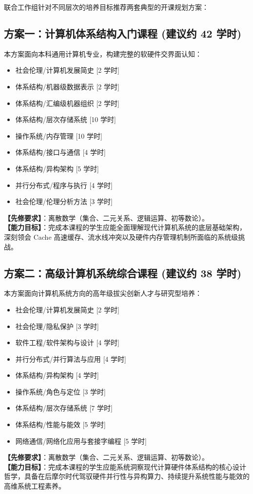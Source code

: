联合工作组针对不同层次的培养目标推荐两套典型的开课规划方案：

\subsection{方案一：计算机体系结构入门课程 (建议约 42 学时)}
本方案面向本科通用计算机专业，构建完整的软硬件交界面认知：
\begin{itemize}
    \item 社会伦理/计算机发展简史 [2 学时]
    \item 体系结构/机器级数据表示 [2 学时]
    \item 体系结构/汇编级机器组织 [2 学时]
    \item 体系结构/层次存储系统 [10 学时]
    \item 操作系统/内存管理 [10 学时]
    \item 体系结构/接口与通信 [4 学时]
    \item 体系结构/异构架构 [5 学时]
    \item 并行分布式/程序与执行 [4 学时]
    \item 社会伦理/伦理分析方法 [3 学时]
\end{itemize}
\textbf{【先修要求】}：离散数学（集合、二元关系、逻辑运算、初等数论）。\\
\textbf{【能力目标】}：完成本课程的学生应能全面理解现代计算机系统的底层基础架构，深刻领会 Cache 高速缓存、流水线冲突以及硬件内存管理机制所面临的系统级挑战。

\subsection{方案二：高级计算机系统综合课程 (建议约 38 学时)}
本方案面向计算机系统方向的高年级拔尖创新人才与研究型培养：
\begin{itemize}
    \item 社会伦理/计算机发展简史 [2 学时]
    \item 社会伦理/隐私保护 [3 学时]
    \item 软件工程/软件架构与设计 [4 学时]
    \item 并行分布式/并行算法与应用 [4 学时]
    \item 体系结构/异构架构 [4 学时]
    \item 操作系统/角色与定位 [3 学时]
    \item 体系结构/层次存储系统 [7 学时]
    \item 体系结构/性能与能效 [5 学时]
    \item 网络通信/网络化应用与套接字编程 [5 学时]
\end{itemize}
\textbf{【先修要求】}：离散数学（集合、二元关系、逻辑运算、初等数论）。\\
\textbf{【能力目标】}：完成本课程的学生应能系统洞察现代计算硬件体系结构的核心设计哲学，具备在后摩尔时代驾驭硬件并行性与异构算力、持续提升系统性能与能效的高维系统工程素养。

